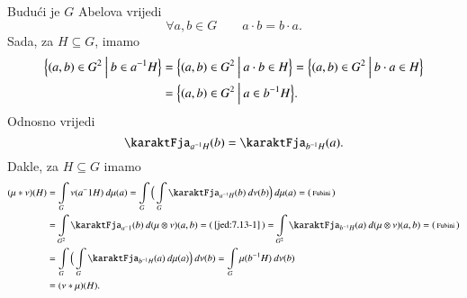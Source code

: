 \begin{rj}[\ref{zad:7.13}]
    Budu\' ci je $G$ Abelova vrijedi
    \begin{equation*}
        \forall a, b \in G \quad \quad a \cdot b = b \cdot a.
    \end{equation*}
    Sada, za $H \subseteq G$, imamo
    \begin{equation*}
        \begin{aligned}
            \Big\{ {(a, b) \in G^2} \: \Big| \: {b \in a^{-1} H} \Big\} &= \Big\{ {(a, b) \in G^2} \: \Big| \: {a \cdot b \in H} \Big\} = \Big\{ {(a, b) \in G^2} \: \Big| \: {b \cdot a \in H} \Big\}\\
            &= \Big\{ {(a, b) \in G^2} \: \Big| \: {a \in b^{-1} H} \Big\}.
        \end{aligned}
    \end{equation*}
    Odnosno vrijedi
    \begin{equation}    \label{jed:7.13-1}
        \karaktFja_{a^{-1} H} (b) = \karaktFja_{b^{-1} H} (a).
    \end{equation}
    Dakle, za $H \subseteq G$ imamo
    \begin{equation*}
        \begin{aligned}
            (\mu * \nu) (H) &= \int\limits_G \nu (a^-1 H) \: d \mu (a) = \int\limits_G \Big( \int\limits_G \karaktFja_{a^{-1} H} (b) \: d \nu (b) \Big) \: d \mu (a) =
                \begin{psmallmatrix}
                    \textnormal{Fubini}
                \end{psmallmatrix}\\
            &= \int\limits_{G^2} \karaktFja_{a^-1} (b) \: d ( \mu \otimes \nu ) (a, b) =
                \begin{psmallmatrix}
                    \ref{jed:7.13-1}
                \end{psmallmatrix}
            = \int\limits_{G^2} \karaktFja_{b^{-1} H} (a) \: d (\mu \otimes \nu) (a, b) =
                \begin{psmallmatrix}
                    \textnormal{Fubini}
                \end{psmallmatrix}\\
            &= \int\limits_G \Big( \int\limits_G \karaktFja_{b^{-1} H} (a) \: d \mu (a) \Big) \: d \nu (b) = \int\limits_G \mu (b^{-1} H) \: d \nu (b)\\
            &= (\nu * \mu) (H).
        \end{aligned}
    \end{equation*}
\end{rj}

